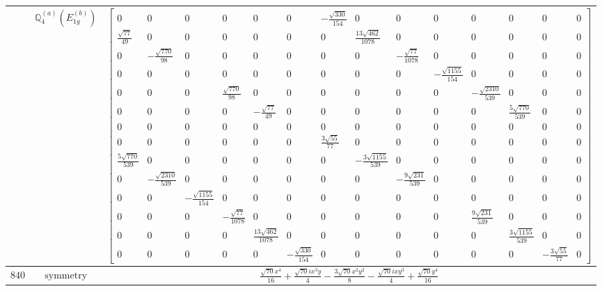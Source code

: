 \documentclass[fleqn,8pt,landscape]{jsarticle}
\begin{document}
\begin{longtable}{ccc}
$  $ & $ \mathbb{Q}_{4}^{(a)}(E_{1g}^{(b)}) $ & $ \begin{bmatrix} 0 & 0 & 0 & 0 & 0 & 0 & - \frac{\sqrt{330}}{154} & 0 & 0 & 0 & 0 & 0 & 0 & 0 \\ \frac{\sqrt{77}}{49} & 0 & 0 & 0 & 0 & 0 & 0 & \frac{13 \sqrt{462}}{1078} & 0 & 0 & 0 & 0 & 0 & 0 \\ 0 & - \frac{\sqrt{770}}{98} & 0 & 0 & 0 & 0 & 0 & 0 & - \frac{\sqrt{77}}{1078} & 0 & 0 & 0 & 0 & 0 \\ 0 & 0 & 0 & 0 & 0 & 0 & 0 & 0 & 0 & - \frac{\sqrt{1155}}{154} & 0 & 0 & 0 & 0 \\ 0 & 0 & 0 & \frac{\sqrt{770}}{98} & 0 & 0 & 0 & 0 & 0 & 0 & - \frac{\sqrt{2310}}{539} & 0 & 0 & 0 \\ 0 & 0 & 0 & 0 & - \frac{\sqrt{77}}{49} & 0 & 0 & 0 & 0 & 0 & 0 & \frac{5 \sqrt{770}}{539} & 0 & 0 \\ 0 & 0 & 0 & 0 & 0 & 0 & 0 & 0 & 0 & 0 & 0 & 0 & 0 & 0 \\ 0 & 0 & 0 & 0 & 0 & 0 & \frac{3 \sqrt{55}}{77} & 0 & 0 & 0 & 0 & 0 & 0 & 0 \\ \frac{5 \sqrt{770}}{539} & 0 & 0 & 0 & 0 & 0 & 0 & - \frac{3 \sqrt{1155}}{539} & 0 & 0 & 0 & 0 & 0 & 0 \\ 0 & - \frac{\sqrt{2310}}{539} & 0 & 0 & 0 & 0 & 0 & 0 & - \frac{9 \sqrt{231}}{539} & 0 & 0 & 0 & 0 & 0 \\ 0 & 0 & - \frac{\sqrt{1155}}{154} & 0 & 0 & 0 & 0 & 0 & 0 & 0 & 0 & 0 & 0 & 0 \\ 0 & 0 & 0 & - \frac{\sqrt{77}}{1078} & 0 & 0 & 0 & 0 & 0 & 0 & \frac{9 \sqrt{231}}{539} & 0 & 0 & 0 \\ 0 & 0 & 0 & 0 & \frac{13 \sqrt{462}}{1078} & 0 & 0 & 0 & 0 & 0 & 0 & \frac{3 \sqrt{1155}}{539} & 0 & 0 \\ 0 & 0 & 0 & 0 & 0 & - \frac{\sqrt{330}}{154} & 0 & 0 & 0 & 0 & 0 & 0 & - \frac{3 \sqrt{55}}{77} & 0 \end{bmatrix} $ \\ \hline
$ 840 $ & $ \text{symmetry} $ & $ \frac{\sqrt{70} x^{4}}{16} + \frac{\sqrt{70} i x^{3} y}{4} - \frac{3 \sqrt{70} x^{2} y^{2}}{8} - \frac{\sqrt{70} i x y^{3}}{4} + \frac{\sqrt{70} y^{4}}{16} $ \\

\end{longtable}
\end{document}

